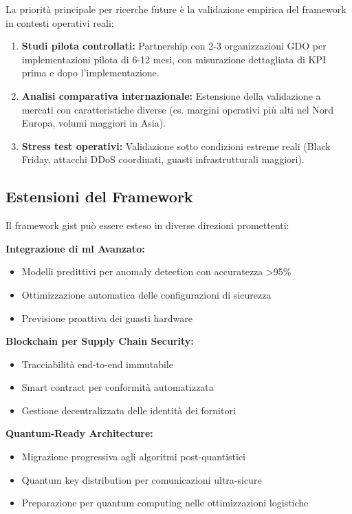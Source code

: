 La priorità principale per ricerche future è la validazione empirica del framework in contesti operativi reali:

\begin{enumerate}
\item \textbf{Studi pilota controllati:} Partnership con 2-3 organizzazioni GDO per implementazioni pilota di 6-12 mesi, con misurazione dettagliata di KPI prima e dopo l'implementazione.

\item \textbf{Analisi comparativa internazionale:} Estensione della validazione a mercati con caratteristiche diverse (es. margini operativi più alti nel Nord Europa, volumi maggiori in Asia).

\item \textbf{Stress test operativi:} Validazione sotto condizioni estreme reali (Black Friday, attacchi DDoS coordinati, guasti infrastrutturali maggiori).
\end{enumerate}

\subsection{\texorpdfstring{Estensioni del Framework}{5.7.2 - Estensioni del Framework}}
\label{subsec:5.7.2}

Il framework \gls{gist} può essere esteso in diverse direzioni promettenti:

\textbf{Integrazione di \gls{ml} Avanzato:}
\begin{itemize}
\item Modelli predittivi per anomaly detection con accuratezza >95\%
\item Ottimizzazione automatica delle configurazioni di sicurezza
\item Previsione proattiva dei guasti hardware
\end{itemize}

\textbf{Blockchain per Supply Chain Security:}
\begin{itemize}
\item Tracciabilità end-to-end immutabile
\item Smart contract per conformità automatizzata
\item Gestione decentralizzata delle identità dei fornitori
\end{itemize}

\textbf{Quantum-Ready Architecture:}
\begin{itemize}
\item Migrazione progressiva agli algoritmi post-quantistici
\item Quantum key distribution per comunicazioni ultra-sicure
\item Preparazione per quantum computing nelle ottimizzazioni logistiche
\end{itemize}

